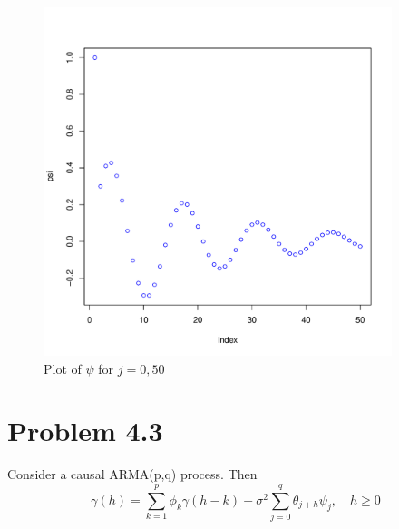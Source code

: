 \documentclass[11pt, oneside]{article}   	%
\begin{document}
\begin{figure}[H] %
   \centering
   \includegraphics[width=4in]{psi} 
   \caption{Plot of $\psi$ for $j = 0, 50$}
   \label{fig:psi}
\end{figure}

\section{Problem 4.3}
Consider a causal ARMA(p,q) process. Then
\begin{equation}\label{eq:gamma}
\gamma(h)= \sum_{k=1}^{p}\phi_{k}\gamma(h-k) + \sigma^{2}\sum_{j=0}^{q}\theta_{j+h}\psi_{j}, \quad h\geq 0
\end{equation}
\end{document}

